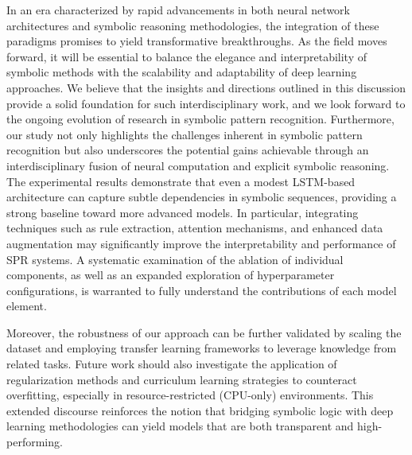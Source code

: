 \documentclass{article}
\begin{document}
In an era characterized by rapid advancements in both neural network architectures and symbolic reasoning methodologies, the integration of these paradigms promises to yield transformative breakthroughs. As the field moves forward, it will be essential to balance the elegance and interpretability of symbolic methods with the scalability and adaptability of deep learning approaches. We believe that the insights and directions outlined in this discussion provide a solid foundation for such interdisciplinary work, and we look forward to the ongoing evolution of research in symbolic pattern recognition.
Furthermore, our study not only highlights the challenges inherent in symbolic pattern recognition but also underscores the potential gains achievable through an interdisciplinary fusion of neural computation and explicit symbolic reasoning. The experimental results demonstrate that even a modest LSTM-based architecture can capture subtle dependencies in symbolic sequences, providing a strong baseline toward more advanced models. In particular, integrating techniques such as rule extraction, attention mechanisms, and enhanced data augmentation may significantly improve the interpretability and performance of SPR systems. A systematic examination of the ablation of individual components, as well as an expanded exploration of hyperparameter configurations, is warranted to fully understand the contributions of each model element.

Moreover, the robustness of our approach can be further validated by scaling the dataset and employing transfer learning frameworks to leverage knowledge from related tasks. Future work should also investigate the application of regularization methods and curriculum learning strategies to counteract overfitting, especially in resource-restricted (CPU-only) environments. This extended discourse reinforces the notion that bridging symbolic logic with deep learning methodologies can yield models that are both transparent and high-performing. 
\end{document}

